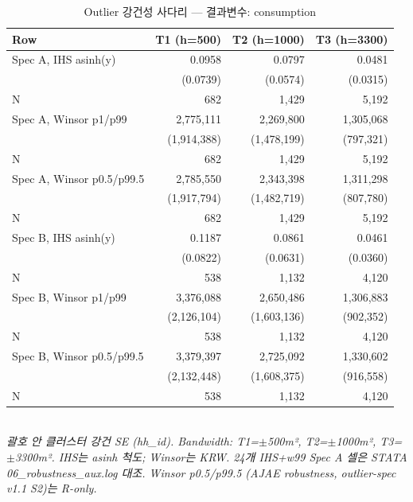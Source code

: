 \begin{table}[t]
\centering
\caption{Outlier 강건성 사다리 — 결과변수: consumption}
\label{tab:rob_outlier_consumption_ko}
\begin{tabular}{lrrr}
\toprule
Row & T1 (h=500) & T2 (h=1000) & T3 (h=3300) \\
\midrule
Spec A, IHS asinh(y) & 0.0958 & 0.0797 & 0.0481 \\
        & (0.0739) & (0.0574) & (0.0315) \\
N       & 682 & 1,429 & 5,192 \\
Spec A, Winsor p1/p99 & 2,775,111 & 2,269,800 & 1,305,068 \\
        & (1,914,388) & (1,478,199) & (797,321) \\
N       & 682 & 1,429 & 5,192 \\
Spec A, Winsor p0.5/p99.5 & 2,785,550 & 2,343,398 & 1,311,298 \\
        & (1,917,794) & (1,482,719) & (807,780) \\
N       & 682 & 1,429 & 5,192 \\
Spec B, IHS asinh(y) & 0.1187 & 0.0861 & 0.0461 \\
        & (0.0822) & (0.0631) & (0.0360) \\
N       & 538 & 1,132 & 4,120 \\
Spec B, Winsor p1/p99 & 3,376,088 & 2,650,486 & 1,306,883 \\
        & (2,126,104) & (1,603,136) & (902,352) \\
N       & 538 & 1,132 & 4,120 \\
Spec B, Winsor p0.5/p99.5 & 3,379,397 & 2,725,092 & 1,330,602 \\
        & (2,132,448) & (1,608,375) & (916,558) \\
N       & 538 & 1,132 & 4,120 \\
\bottomrule
\end{tabular}
\\
\footnotesize\textit{괄호 안 클러스터 강건 SE (hh\_id). Bandwidth: T1=$\pm$500m², T2=$\pm$1000m², T3=$\pm$3300m². IHS는 asinh 척도; Winsor는 KRW. 24개 IHS+w99 Spec A 셀은 STATA 06\_robustness\_aux.log 대조. Winsor p0.5/p99.5 (AJAE robustness, outlier-spec v1.1 S2)는 R-only.}
\end{table}


